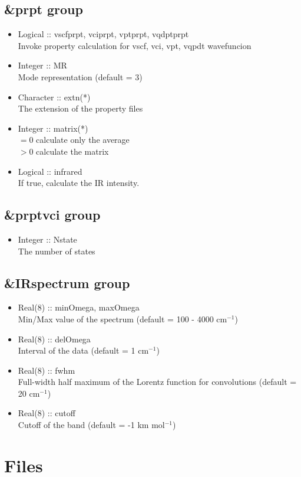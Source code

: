\documentclass[a4paper,12pt]{article}
\begin{document}
\subsection{\&prpt group}
   \begin{itemize}
     \item Logical :: vscfprpt, vciprpt, vptprpt, vqdptprpt \\
       Invoke property calculation for vscf, vci, vpt, vqpdt wavefuncion
     \item Integer :: MR \\
       Mode representation (default = 3)
     \item Character :: extn(*) \\
       The extension of the property files
     \item Integer :: matrix(*) \\
       $=0$ calculate only the average \\
       $>0$ calculate the matrix
     \item Logical :: infrared \\
       If true, calculate the IR intensity.
   \end{itemize}

\subsection{\&prptvci group}
   \begin{itemize} 
     \item Integer :: Nstate \\
       The number of states
   \end{itemize}

\subsection{\&IRspectrum group}
   \begin{itemize} 
     \item Real(8) :: minOmega, maxOmega \\
       Min/Max value of the spectrum (default = 100 - 4000 cm$^{-1}$)
     \item Real(8) :: delOmega \\
       Interval of the data (default = 1 cm$^{-1}$)
     \item Real(8) :: fwhm \\
       Full-width half maximum of the Lorentz function for convolutions (default = 20 cm$^{-1}$)
     \item Real(8) :: cutoff \\
       Cutoff of the band (default = -1 km mol$^{-1}$)
   \end{itemize}

\newpage

\section{Files}

\newpage


\end{document}
